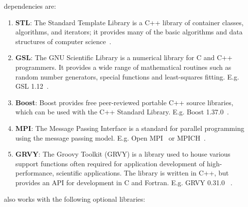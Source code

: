 \Queso dependencies are:
\begin{enumerate}%

  \item \textbf{STL}: The Standard Template Library is a C++ library of container classes, algorithms, and iterators; it provides many of the basic algorithms and data structures of computer science~\cite{STL}. %

  \item \textbf{GSL}: The GNU Scientific Library is a numerical library for C and C++ programmers. It provides a wide range of mathematical routines such as random number generators, special functions and least-squares fitting. E.g. GSL 1.12~\cite{Gsl}. %

  \item \textbf{Boost}: Boost provides free peer-reviewed portable C++ source libraries, which can be used with the C++ Standard Library. E.g. Boost 1.37.0~\cite{Boost}.

  \item \textbf{MPI}: The Message Passing Interface is a standard for parallel programming using the message passing model. E.g. Open MPI~\cite{Openmpi} or MPICH~\cite{Mpich}. 

  \item \textbf{GRVY}: The Groovy Toolkit (GRVY) is a library used to house various support functions often required for application development of high-performance, scientific applications. The library is written in C++, but provides an API for development in C and Fortran. E.g. GRVY 0.31.0 ~\cite{grvy}.

\end{enumerate}%

\Queso{} also works with the following optional libraries:

